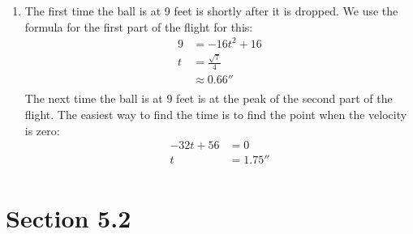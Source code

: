 \documentclass{exam}
\begin{document}
\begin{solution}
\begin{enumerate}[a]
\item
The first time the ball is at 9 feet is shortly after it is dropped.  We use the formula for the first part of the
flight for this:
\begin{align*}
  9 &= -16t^2 + 16 \\
  t &= \frac{\sqrt{7}}{4} \\
    &\approx 0.66 \second \\
\end{align*}
The next time the ball is at 9 feet is at the peak of the second part of the flight.  The easiest way to find the time
is to find the point when the velocity is zero:
\begin{align*}
    -32t + 56 &= 0 \\
    t &= 1.75 \second \\
\end{align*}

\end{enumerate}

\end{solution}

\ifprintanswers
\pagebreak

\section{Section 5.2}
\end{document}
